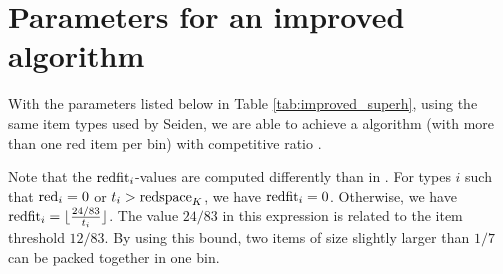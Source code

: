 \section{Parameters for an improved {\SuperH} algorithm}

With the parameters listed below in Table \ref{tab:improved_superh}, using the same item types used by Seiden, we are able to achieve a {\SuperH} algorithm (with more than one red item per bin) with competitive ratio \newsuperhratio.

Note that the $\mathrm{redfit}_i$-values are computed differently than in \Hpp{}. For types $i$ such that $\mathrm{red}_i=0$ or $t_i > \mathrm{redspace}_K$, we have $\mathrm{redfit}_i=0$. Otherwise, we have $\mathrm{redfit}_i=\lfloor \frac{24/83}{t_i} \rfloor$. The value $24/83$ in this expression is related to the item threshold $12/83$. By using this bound, two items of size slightly larger than $1/7$ can be packed together in one bin.

